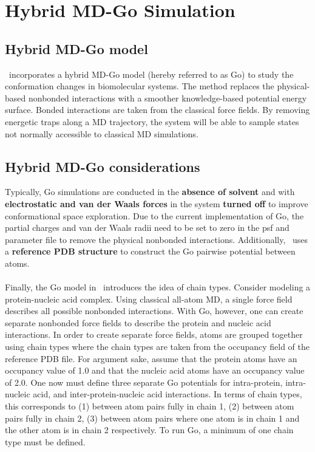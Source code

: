\section{Hybrid MD-Go Simulation}
\label{section:Go simulation}

\subsection{Hybrid MD-Go model}

\NAMD\ incorporates a hybrid MD-Go model (hereby referred to as Go)
 to study the conformation changes in biomolecular systems.  The method replaces the physical-based
nonbonded interactions with a smoother knowledge-based potential energy surface.  
Bonded interactions are taken from the classical force fields.
By removing energetic traps along a MD trajectory,
the system will be able to sample states not normally accessible to classical MD simulations.

\subsection{Hybrid MD-Go considerations}  
Typically, Go simulations are conducted in the \textbf{absence of solvent} and with
 \textbf{electrostatic and van der Waals forces} in the system \textbf{turned off}
 to improve conformational space exploration.  Due to the current implementation of Go, 
the partial charges and van der Waals radii need to be set to zero in the psf and parameter file
to remove the physical nonbonded interactions.  Additionally, \NAMD\ uses a \textbf{reference PDB structure} 
to construct the Go pairwise potential between atoms.  \\
\\
Finally, the Go model in \NAMD\ introduces the idea of chain types.
Consider modeling a protein-nucleic acid complex.  Using classical all-atom MD, a single force field
 describes all possible nonbonded interactions.  With Go, however, one can create separate nonbonded force fields to describe the protein 
and nucleic acid interactions.  In order to create separate force fields, atoms are grouped together using chain types where the
chain types are taken from the occupancy field of the reference PDB file.  For argument sake, assume that the protein atoms have
an occupancy value of 1.0 and that the nucleic acid atoms have an occupancy value of 2.0.  One now must define three separate Go potentials
for intra-protein, intra-nucleic acid, and inter-protein-nucleic acid interactions.  In terms of chain types, this corresponds to 
 (1) between atom pairs fully in chain 1, (2) between atom pairs fully in chain 2, (3) between atom pairs where one atom is in chain 1 and 
the other atom is in chain 2 respectively.  To run Go, a minimum of one chain type must be defined.

